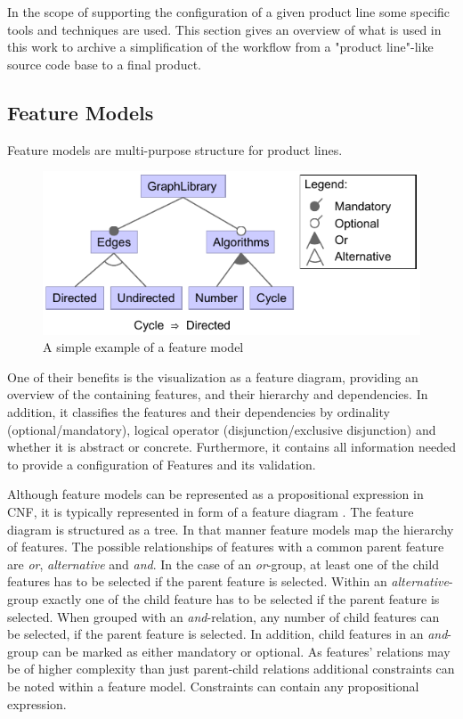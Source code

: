 In the scope of supporting the configuration of a given product line some specific tools and techniques are used. This section gives an overview of what is used in this work to archive a simplification of the workflow from a "product line"-like source code base to a final product.

\subsection{Feature Models} \label{ch:fm}
Feature models are multi-purpose structure for product lines. 
\begin{figure}
	\includegraphics{img/img-fm.pdf}
	\caption{A simple example of a feature model}
	\label{img-fm}
\end{figure}
One of their benefits is the visualization as a feature diagram, providing an overview of the containing features, and their hierarchy and dependencies. In addition, it classifies the features and their dependencies by ordinality (optional/mandatory), logical operator (disjunction/exclusive disjunction) and whether it is abstract or concrete. Furthermore, it contains all information needed to provide a configuration of Features and its validation.

Although feature models can be represented as a propositional expression in CNF, it is typically represented in form of a feature diagram \cite{fmgp}. The feature diagram is structured as a tree. In that manner feature models map the hierarchy of features. The possible relationships of features with a common parent feature are \textit{or}, \textit{alternative} and \textit{and}. In the case of an \textit{or}-group, at least one of the child features has to be selected if the parent feature is selected. Within an \textit{alternative}-group exactly one of the child feature has to be selected if the parent feature is selected. When grouped with an \textit{and}-relation, any number of child features can be selected, if the parent feature is selected. In addition, child features in an \textit{and}-group can be marked as either mandatory or optional.  As features' relations may be of higher complexity than just parent-child relations additional constraints can be noted within a feature model. Constraints can contain any propositional expression.

